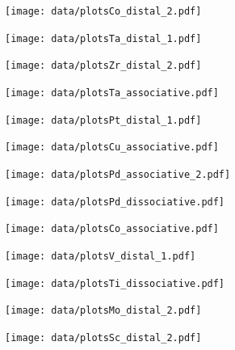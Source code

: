 \begin{figure}
\centering
\texttt{[image: data/plotsCo\_distal\_2.pdf]}
\end{figure}

\begin{figure}
\centering
\texttt{[image: data/plotsTa\_distal\_1.pdf]}
\end{figure}

\begin{figure}
\centering
\texttt{[image: data/plotsZr\_distal\_2.pdf]}
\end{figure}

\begin{figure}
\centering
\texttt{[image: data/plotsTa\_associative.pdf]}
\end{figure}

\begin{figure}
\centering
\texttt{[image: data/plotsPt\_distal\_1.pdf]}
\end{figure}

\begin{figure}
\centering
\texttt{[image: data/plotsCu\_associative.pdf]}
\end{figure}

\begin{figure}
\centering
\texttt{[image: data/plotsPd\_associative\_2.pdf]}
\end{figure}

\begin{figure}
\centering
\texttt{[image: data/plotsPd\_dissociative.pdf]}
\end{figure}

\begin{figure}
\centering
\texttt{[image: data/plotsCo\_associative.pdf]}
\end{figure}

\begin{figure}
\centering
\texttt{[image: data/plotsV\_distal\_1.pdf]}
\end{figure}

\begin{figure}
\centering
\texttt{[image: data/plotsTi\_dissociative.pdf]}
\end{figure}

\begin{figure}
\centering
\texttt{[image: data/plotsMo\_distal\_2.pdf]}
\end{figure}

\begin{figure}
\centering
\texttt{[image: data/plotsSc\_distal\_2.pdf]}
\end{figure}

